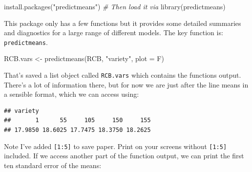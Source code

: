 \documentclass[
]{book}
\newenvironment{Shaded}{\begin{snugshade}}{\end{snugshade}}
\newcommand{\AttributeTok}[1]{\textcolor[rgb]{0.77,0.63,0.00}{#1}}
\newcommand{\CommentTok}[1]{\textcolor[rgb]{0.56,0.35,0.01}{\textit{#1}}}
\newcommand{\DecValTok}[1]{\textcolor[rgb]{0.00,0.00,0.81}{#1}}
\newcommand{\FunctionTok}[1]{\textcolor[rgb]{0.00,0.00,0.00}{#1}}
\newcommand{\NormalTok}[1]{#1}
\newcommand{\OtherTok}[1]{\textcolor[rgb]{0.56,0.35,0.01}{#1}}
\newcommand{\SpecialCharTok}[1]{\textcolor[rgb]{0.00,0.00,0.00}{#1}}
\newcommand{\StringTok}[1]{\textcolor[rgb]{0.31,0.60,0.02}{#1}}
\begin{document}
\begin{Shaded}
\begin{Highlighting}[]
\FunctionTok{install.packages}\NormalTok{(}\StringTok{"predictmeans"}\NormalTok{)}
\CommentTok{\# Then load it via}
\FunctionTok{library}\NormalTok{(predictmeans)}
\end{Highlighting}
\end{Shaded}

This package only has a few functions but it provides some detailed summaries and diagnostics for a large range of different models. The key function is: \texttt{predictmeans}.

\begin{Shaded}
\begin{Highlighting}[]
\NormalTok{RCB.vars }\OtherTok{\textless{}{-}} \FunctionTok{predictmeans}\NormalTok{(RCB, }\StringTok{"variety"}\NormalTok{, }\AttributeTok{plot =}\NormalTok{ F)}
\end{Highlighting}
\end{Shaded}

That's saved a list object called \texttt{RCB.vars} which contains the functions output. There's a lot of information there, but for now we are just after the line means in a sensible format, which we can access using:

\begin{Shaded}
\end{Shaded}

\begin{verbatim}
## variety
##       1      55     105     150     155 
## 17.9850 18.6025 17.7475 18.3750 18.2625
\end{verbatim}

Note I've added \texttt{{[}1:5{]}} to save paper. Print on your screens without \texttt{{[}1:5{]}} included. If we access another part of the function output, we can print the first ten standard error of the means:

\begin{Shaded}
\end{Shaded}
\end{document}
